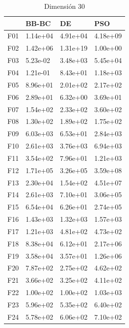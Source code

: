 \begin{table}[H]
\begin{minipage}{.5\linewidth}
    \end{minipage}%
    \begin{minipage}{.5\linewidth}
      \centering
        \caption{Dimensión 30}
        \begin{tabular}{llll}
            \toprule
            {} &     BB-BC &        DE &       PSO \\
            \midrule
            F01  &  1.14e+04 &  4.91e+04 &  4.18e+09 \\
            F02  &  1.42e+06 &  1.31e+19 &  1.00e+00 \\
            F03  &  5.23e-02 &  3.48e+03 &  5.45e+04 \\
            F04  &  1.21e-01 &  8.43e+01 &  1.18e+03 \\
            F05  &  8.96e+01 &  2.01e+02 &  2.17e+02 \\
            F06  &  2.89e+01 &  6.32e+00 &  3.69e+01 \\
            F07  &  1.54e+02 &  2.33e+02 &  3.60e+02 \\
            F08  &  1.30e+02 &  1.89e+02 &  1.75e+02 \\
            F09  &  6.03e+03 &  6.53e+01 &  2.84e+03 \\
            F10  &  2.61e+03 &  3.76e+03 &  6.94e+03 \\
            F11  &  3.54e+02 &  7.96e+01 &  1.21e+03 \\
            F12  &  1.71e+05 &  3.26e+05 &  3.59e+08 \\
            F13  &  2.30e+04 &  1.54e+02 &  4.51e+07 \\
            F14  &  2.61e+03 &  7.10e+01 &  3.06e+05 \\
            F15  &  6.54e+04 &  6.26e+01 &  2.74e+05 \\
            F16  &  1.43e+03 &  1.32e+03 &  1.57e+03 \\
            F17  &  1.21e+03 &  4.81e+02 &  4.73e+02 \\
            F18  &  8.38e+04 &  6.12e+01 &  2.17e+06 \\
            F19  &  3.58e+04 &  3.57e+01 &  1.26e+06 \\
            F20  &  7.87e+02 &  2.75e+02 &  4.62e+02 \\
            F21  &  3.66e+02 &  3.25e+02 &  4.11e+02 \\
            F22  &  1.00e+02 &  1.00e+02 &  1.03e+03 \\
            F23  &  5.96e+02 &  5.35e+02 &  6.40e+02 \\
            F24  &  5.78e+02 &  6.06e+02 &  7.10e+02 \\

\end{tabular}
\end{minipage}
\end{table}
